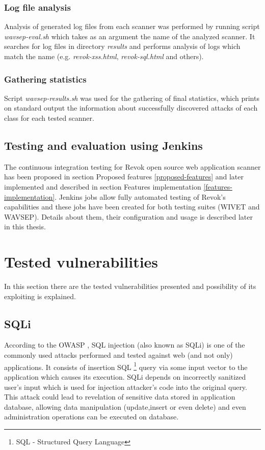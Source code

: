 		\subsubsection{Log file analysis}				
		Analysis of generated log files from each scanner was performed by running script \textit{wavsep-eval.sh} which takes as an argument the name of the analyzed scanner. It searches for log files in directory \textit{results} and performs analysis of logs which match the name (e.g. \textit{revok-xss.html}, \textit{revok-sql.html} and others).
	
		\subsubsection{Gathering statistics}		
		Script \textit{wavsep-results.sh} was used for the gathering of final statistics, which prints on standard output the information about successfully discovered attacks of each class for each tested scanner.	
		
		
	\subsection{Testing and evaluation using Jenkins}
	
	The continuous integration testing for Revok open source web application scanner has been proposed in section Proposed features \ref{proposed-features} and later implemented and described in section Features implementation \ref{features-implementation}. Jenkins jobs allow fully automated testing of Revok's capabilities and these jobs have been created for both testing suites (WIVET and WAVSEP). Details about them, their configuration and usage is described later in this thesis.
				
	\section{Tested vulnerabilities}\label{testing-vulnerabilities}
	
		In this section there are the tested vulnerabilities presented and possibility of its exploiting is explained.
	
		\subsection{SQLi}

		According to the OWASP \cite{SQLi}, SQL injection (also known as SQLi) is one of the commonly used attacks performed and tested against web (and not only) applications. It consists of insertion SQL \footnote{SQL - Structured Query Language} query via some input vector to the application which causes its execution. SQLi depends on incorrectly sanitized user's input which is used for injection attacker's code into the original query. This attack could lead to revelation of sensitive data stored in application database, allowing data manipulation (update,insert or even delete) and even administration operations can be executed on database.
		
